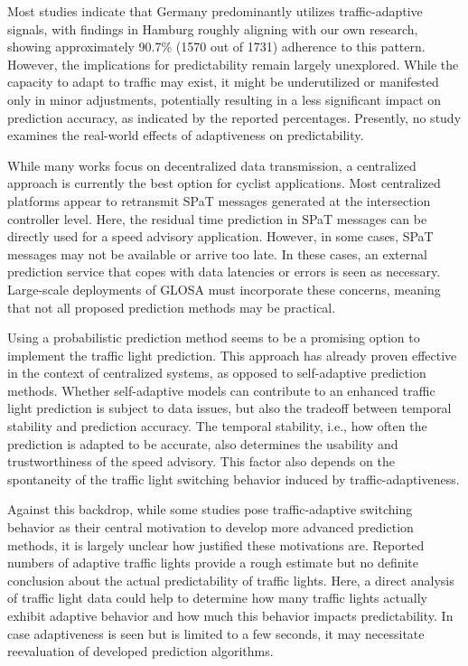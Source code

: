 Most studies indicate that Germany predominantly utilizes traffic-adaptive signals, with findings in Hamburg roughly aligning with our own research, showing approximately 90.7\% (1570 out of 1731) adherence to this pattern. However, the implications for predictability remain largely unexplored. While the capacity to adapt to traffic may exist, it might be underutilized or manifested only in minor adjustments, potentially resulting in a less significant impact on prediction accuracy, as indicated by the reported percentages. Presently, no study examines the real-world effects of adaptiveness on predictability.

\begin{Summary}
While many works focus on decentralized data transmission, a centralized approach is currently the best option for cyclist applications. Most centralized platforms appear to retransmit SPaT messages generated at the intersection controller level. Here, the residual time prediction in SPaT messages can be directly used for a speed advisory application. However, in some cases, SPaT messages may not be available or arrive too late. In these cases, an external prediction service that copes with data latencies or errors is seen as necessary. Large-scale deployments of GLOSA must incorporate these concerns, meaning that not all proposed prediction methods may be practical.

Using a probabilistic prediction method seems to be a promising option to implement the traffic light prediction. This approach has already proven effective in the context of centralized systems, as opposed to self-adaptive prediction methods. Whether self-adaptive models can contribute to an enhanced traffic light prediction is subject to data issues, but also the tradeoff between temporal stability and prediction accuracy. The temporal stability, i.e., how often the prediction is adapted to be accurate, also determines the usability and trustworthiness of the speed advisory. This factor also depends on the spontaneity of the traffic light switching behavior induced by traffic-adaptiveness.

Against this backdrop, while some studies pose traffic-adaptive switching behavior as their central motivation to develop more advanced prediction methods, it is largely unclear how justified these motivations are. Reported numbers of adaptive traffic lights provide a rough estimate but no definite conclusion about the actual predictability of traffic lights. Here, a direct analysis of traffic light data could help to determine how many traffic lights actually exhibit adaptive behavior and how much this behavior impacts predictability. In case adaptiveness is seen but is limited to a few seconds, it may necessitate reevaluation of developed prediction algorithms.
\end{Summary}

